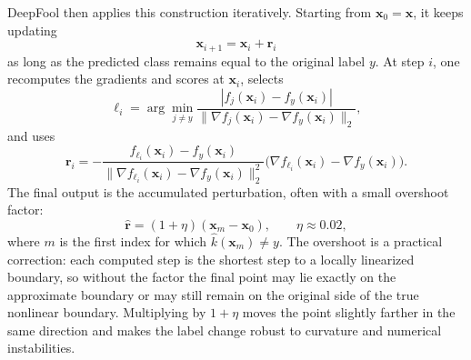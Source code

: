 \begin{example}
DeepFool then applies this construction iteratively. Starting from
$\mathbf{x}_0=\mathbf{x}$, it keeps updating
\[
  \mathbf{x}_{i+1} = \mathbf{x}_i + \mathbf{r}_i
\]
as long as the predicted class remains equal to the original label $y$.
At step $i$, one recomputes the gradients and scores at $\mathbf{x}_i$,
selects
\[
  \ell_i
  =
  \arg\min_{j\neq y}
  \frac{|f_j(\mathbf{x}_i)-f_y(\mathbf{x}_i)|}
  {\|\nabla f_j(\mathbf{x}_i)-\nabla f_y(\mathbf{x}_i)\|_2},
\]
and uses
\[
  \mathbf{r}_i
  =
  -
  \frac{f_{\ell_i}(\mathbf{x}_i)-f_y(\mathbf{x}_i)}
  {\|\nabla f_{\ell_i}(\mathbf{x}_i)-\nabla f_y(\mathbf{x}_i)\|_2^2}
  \bigl(\nabla f_{\ell_i}(\mathbf{x}_i)-\nabla f_y(\mathbf{x}_i)\bigr).
\]
The final output is the accumulated perturbation, often with a small
overshoot factor:
\[
  \hat{\mathbf{r}}
  =
  (1+\eta)(\mathbf{x}_m-\mathbf{x}_0),
  \qquad
  \eta \approx 0.02,
\]
where $m$ is the first index for which
$\hat k(\mathbf{x}_m)\neq y$.
The overshoot is a practical correction: each computed step is the shortest
step to a locally linearized boundary, so without the factor the final point may
lie exactly on the approximate boundary or may still remain on the original side
of the true nonlinear boundary. Multiplying by $1+\eta$ moves the point slightly
farther in the same direction and makes the label change robust to curvature and
numerical instabilities.

\end{example}

